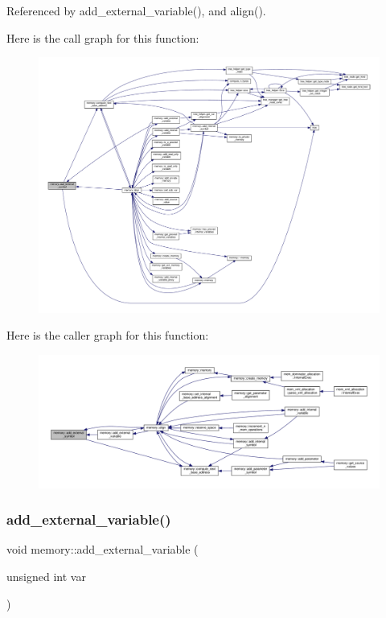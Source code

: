 Referenced by add\+\_\+external\+\_\+variable(), and align().

Here is the call graph for this function\+:
\nopagebreak
\begin{figure}[H]
\begin{center}
\leavevmode
\includegraphics[width=350pt]{d8/d99/classmemory_afc9ff45301d4dbbb7f5a840155f74402_cgraph}
\end{center}
\end{figure}
Here is the caller graph for this function\+:
\nopagebreak
\begin{figure}[H]
\begin{center}
\leavevmode
\includegraphics[width=350pt]{d8/d99/classmemory_afc9ff45301d4dbbb7f5a840155f74402_icgraph}
\end{center}
\end{figure}
\mbox{\label{classmemory_a794e01c8ff2ed36104240903aaa4acd4}} 
\subsubsection{\texorpdfstring{add\+\_\+external\+\_\+variable()}{add\_external\_variable()}}
{\footnotesize\ttfamily void memory\+::add\+\_\+external\+\_\+variable (\begin{DoxyParamCaption}\item[{unsigned int}]{var }\end{DoxyParamCaption})}



